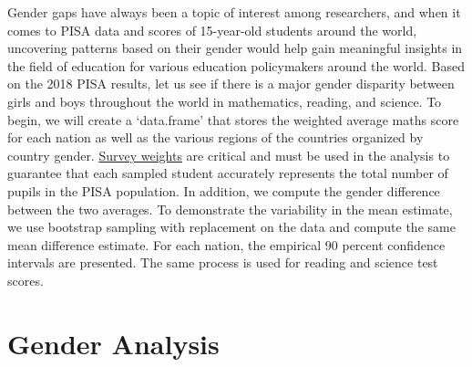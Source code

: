 Gender gaps have always been a topic of interest among researchers, and
when it comes to PISA data and scores of 15-year-old students around the
world, uncovering patterns based on their gender would help gain
meaningful insights in the field of education for various education
policymakers around the world. Based on the 2018 PISA results, let us
see if there is a major gender disparity between girls and boys
throughout the world in mathematics, reading, and science. To begin, we
will create a `data.frame' that stores the weighted average maths score
for each nation as well as the various regions of the countries
organized by country gender.
\href{https://www.oecd.org/pisa/data/2015-technical-report/PISA-2015-Technical-Report-Chapter-8-Survey-Weighting.pdf}{Survey
weights} are critical and must be used in the analysis to guarantee that
each sampled student accurately represents the total number of pupils in
the PISA population. In addition, we compute the gender difference
between the two averages. To demonstrate the variability in the mean
estimate, we use bootstrap sampling with replacement on the data and
compute the same mean difference estimate. For each nation, the
empirical 90 percent confidence intervals are presented. The same
process is used for reading and science test scores.

\hypertarget{gender-analysis}{%
\section{Gender Analysis}\label{gender-analysis}}

